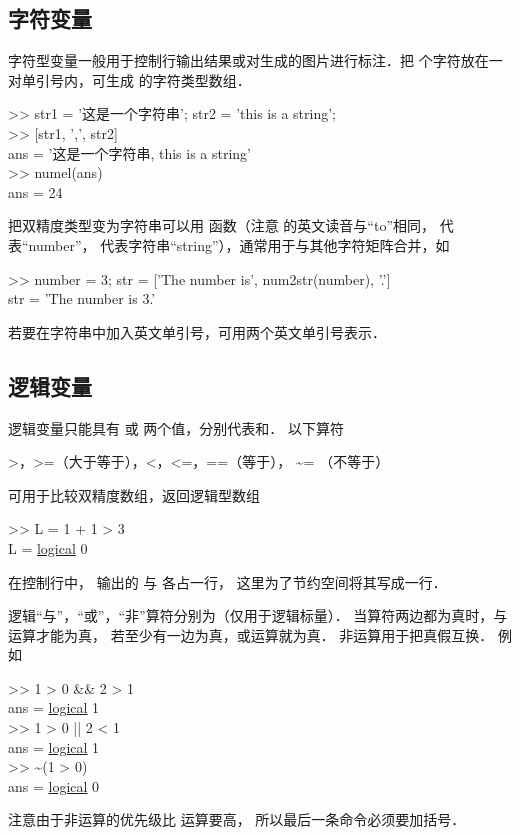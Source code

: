 \subsection{字符变量}

字符型变量一般用于控制行输出结果或对生成的图片进行标注．把  个字符放在一对单引号内，可生成  的字符类型数组．
\begin{Command}
>> str1 = {\color{string}'\!这是一个字符串'}; str2 = {\color{string}'this is a string'};\\
>> [str1, {\color{string}','}, str2] \\
ans = '\!这是一个字符串, this is a string'\\
>> numel(ans) \\
ans = 24
\end{Command}
把双精度类型变为字符串可以用  函数（注意  的英文读音与“to”相同，  代表“number”，  代表字符串“string”），通常用于与其他字符矩阵合并，如
\begin{Command}
>> number = 3; str = [{\color{string}'The number is'}, num2str(number), {\color{string}'.'}] \\
str = 'The number is 3.'
\end{Command}
若要在字符串中加入英文单引号，可用两个英文单引号表示．

\subsection{逻辑变量}

逻辑变量只能具有  或  两个值，分别代表和． 以下算符
\begin{Command}
>，>=（大于等于），<，<=，==（等于）， \~{}= （不等于）
\end{Command}
可用于比较双精度数组，返回逻辑型数组
\begin{Command}
>> L = 1 + 1 > 3 \\
L = {\color{blue}\underline{logical}} 0
\end{Command}
在控制行中， 输出的  与  各占一行， 这里为了节约空间将其写成一行．

逻辑“与”，“或”，“非”算符分别为（仅用于逻辑标量）． 当算符两边都为真时，与运算才能为真， 若至少有一边为真，或运算就为真． 非运算用于把真假互换． 例如
\begin{Command}
>> 1 > 0 \&\& 2 > 1 \\
ans = {\color{blue}\underline{logical}} 1\\
>> 1 > 0 || 2 < 1 \\
ans = {\color{blue}\underline{logical}} 1\\
>> \~ {}(1 > 0)\\
ans = {\color{blue}\underline{logical}} 0
\end{Command}
注意由于非运算的优先级比 \x{>} 运算要高， 所以最后一条命令必须要加括号．

